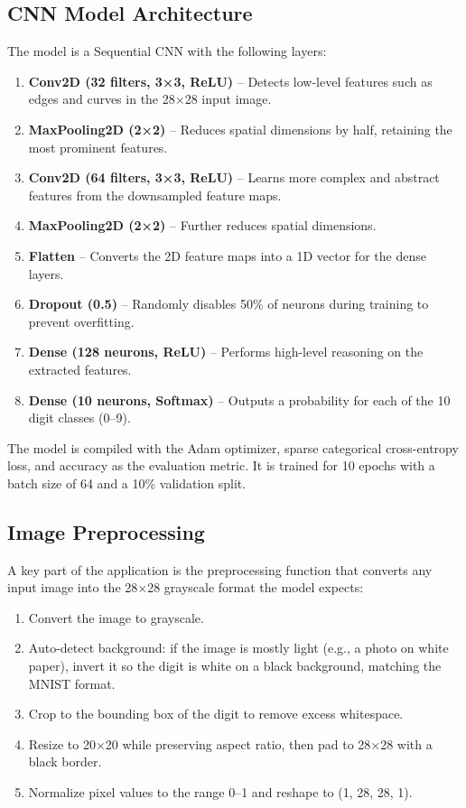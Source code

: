 \documentclass[12pt,a4paper]{report}
\begin{document}
\subsection{CNN Model Architecture}
The model is a Sequential CNN with the following layers:

\begin{enumerate}
    \item \textbf{Conv2D (32 filters, 3×3, ReLU)} -- Detects low-level features such as edges and curves in the 28×28 input image.
    \item \textbf{MaxPooling2D (2×2)} -- Reduces spatial dimensions by half, retaining the most prominent features.
    \item \textbf{Conv2D (64 filters, 3×3, ReLU)} -- Learns more complex and abstract features from the downsampled feature maps.
    \item \textbf{MaxPooling2D (2×2)} -- Further reduces spatial dimensions.
    \item \textbf{Flatten} -- Converts the 2D feature maps into a 1D vector for the dense layers.
    \item \textbf{Dropout (0.5)} -- Randomly disables 50\% of neurons during training to prevent overfitting.
    \item \textbf{Dense (128 neurons, ReLU)} -- Performs high-level reasoning on the extracted features.
    \item \textbf{Dense (10 neurons, Softmax)} -- Outputs a probability for each of the 10 digit classes (0--9).
\end{enumerate}

The model is compiled with the Adam optimizer, sparse categorical cross-entropy loss, and accuracy as the evaluation metric. It is trained for 10 epochs with a batch size of 64 and a 10\% validation split.

\subsection{Image Preprocessing}
A key part of the application is the preprocessing function that converts any input image into the 28×28 grayscale format the model expects:
\begin{enumerate}
    \item Convert the image to grayscale.
    \item Auto-detect background: if the image is mostly light (e.g., a photo on white paper), invert it so the digit is white on a black background, matching the MNIST format.
    \item Crop to the bounding box of the digit to remove excess whitespace.
    \item Resize to 20×20 while preserving aspect ratio, then pad to 28×28 with a black border.
    \item Normalize pixel values to the range 0--1 and reshape to (1, 28, 28, 1).
\end{enumerate}
\end{document}
